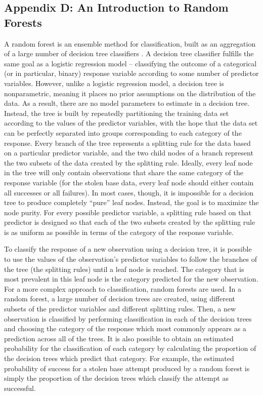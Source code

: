 \documentclass{article}
\begin{document}
\subsection*{Appendix D: An Introduction to Random Forests}

A random forest is an ensemble method for classification, built as an aggregation of a large number of decision tree classifiers \citep{hitchcock}. A decision tree classifier fulfills the same goal as a logistic regression model -- classifying the outcome of a categorical (or in particular, binary) response variable according to some number of predictor variables. However, unlike a logistic regression model, a decision tree is nonparametric, meaning it places no prior assumptions on the distribution of the data. As a result, there are no model parameters to estimate in a decision tree. Instead, the tree is built by repeatedly partitioning the training data set according to the values of the predictor variables, with the hope that the data set can be perfectly separated into groups corresponding to each category of the response. Every branch of the tree represents a splitting rule for the data based on a particular predictor variable, and the two child nodes of a branch represent the two subsets of the data created by the splitting rule. Ideally, every leaf node in the tree will only contain observations that share the same category of the response variable (for the stolen base data, every leaf node should either contain all successes or all failures). In most cases, though, it is impossible for a decision tree to produce completely ``pure'' leaf nodes. Instead, the goal is to maximize the node purity. For every possible predictor variable, a splitting rule based on that predictor is designed so that each of the two subsets created by the splitting rule is as uniform as possible in terms of the category of the response variable. 

To classify the response of a new observation using a decision tree, it is possible to use the values of the observation's predictor variables to follow the branches of the tree (the splitting rules) until a leaf node is reached. The category that is most prevalent in this leaf node is the category predicted for the new observation. For a more complex approach to classification, random forests are used. In a random forest, a large number of decision trees are created, using different subsets of the predictor variables and different splitting rules. Then, a new observation is classified by performing classification in each of the decision trees and choosing the category of the response which most commonly appears as a prediction across all of the trees. It is also possible to obtain an estimated probability for the classification of each category by calculating the proportion of the decision trees which predict that category. For example, the estimated probability of success for a stolen base attempt produced by a random forest is simply the proportion of the decision trees which classify the attempt as successful.  
\end{document}

